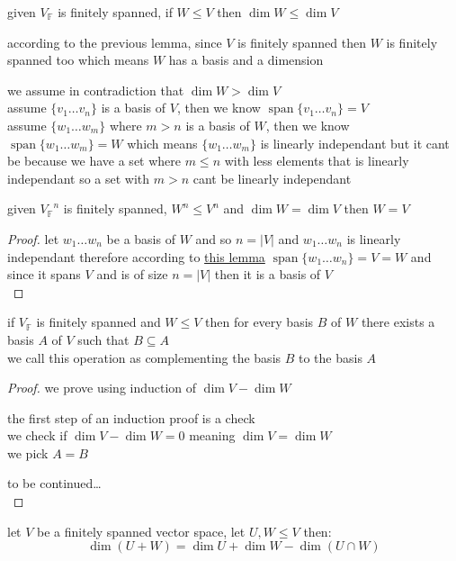 \documentclass[a4paper,12pt]{article}
\DeclareMathOperator{\spn}{span}
\begin{document}
\begin{definition}
\begin{lemma}
given \(V_\mathbb{F}\) is finitely spanned, if \(W \leq V\) then \(\dim W \leq \dim V\)\\
\begin{note}
according to the previous lemma, since \(V\) is finitely spanned then \(W\) is finitely spanned too which means \(W\) has a basis and a dimension\\
\end{note}
we assume in contradiction that \(\dim W > \dim V\)\\
assume \(\{v_1\ldots v_n\}\) is a basis of \(V\), then we know \(\spn\{v_1\ldots v_n\} = V\)\\
assume \(\{w_1\ldots w_m\}\) where \(m > n\) is a basis of \(W\), then we know \(\spn\{w_1\ldots w_m\} = W\) which means \(\{w_1\ldots w_m\}\) is linearly independant but it cant be because we have a set where \(m \leq n\) with less elements that is linearly independant so a set with \(m > n\) cant be linearly independant\\
\end{lemma}

\begin{lemma}
given \({V_\mathbb{F}}^n\) is finitely spanned, \(W^n \leq V^n\) and \(\dim W = \dim V\) then \(W = V\)\\
\begin{proof}
let \(w_1\ldots w_n\) be a basis of \(W\) and so \(n = |V|\) and \(w_1\ldots w_n\) is linearly independant therefore according to \hyperref[orgee4ccd8]{this lemma} \(\spn\{w_1\ldots w_n\} = V = W\) and since it spans \(V\) and is of size \(n = |V|\) then it is a basis of \(V\)\\
\end{proof}
\end{lemma}

\begin{lemma}
if \(V_\mathbb{F}\) is finitely spanned and \(W \leq V\) then for every basis \(B\) of \(W\) there exists a basis \(A\) of \(V\) such that \(B \subseteq A\)\\
we call this operation as complementing the basis \(B\) to the basis \(A\)\\
\begin{proof}
we prove using induction of \(\dim V - \dim W\)\\
\begin{step}
the first step of an induction proof is a check\\
we check if \(\dim V - \dim W = 0\) meaning \(\dim V = \dim W\)\\
we pick \(A = B\)\\
\end{step}
to be continued\ldots{}\\
\end{proof}
\end{lemma}
\begin{lemma}
let \(V\) be a finitely spanned vector space, let \(U,W \leq V\) then:\\
\[
  \dim(U + W) = \dim U + \dim W - \dim(U \cap W)
\]\\


\end{lemma}
\end{definition}
\end{document}
